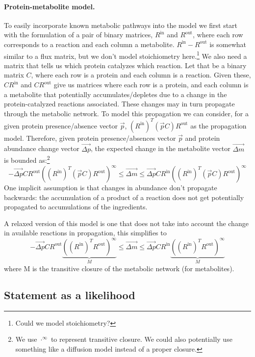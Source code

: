 \documentclass{article}
\begin{document}
\paragraph{Protein-metabolite model.}
To easily incorporate known metabolic pathways into the model we first start with the formulation of a pair of binary matrices, $R^\text{in}$ and $R^\text{out}$, where each row corresponds to a reaction and each column a metabolite.
$R^\text{in} - R^\text{out}$ is somewhat similar to a flux matrix, but we don't model stoichiometry here.\footnote{Could we model stoichiometry?}
We also need a matrix that tells us which protein catalyzes which reaction.
Let that be a binary matrix $C$, where each row is a protein and each column is a reaction.
Given these, $C R^\text{in}$ and $C R^\text{out}$ give us matrices where each row is a protein, and each column is a metabolite that potentially accumulates/depletes due to a change in the protein-catalyzed reactions associated.
These changes may in turn propagate through the metabolic network.
To model this propagation we can consider, for a given protein presence/absence vector $\vec p$, $(R^\text{in})^T ( \vec p C ) R^\text{out}$ as the propagation model.
Therefore, given protein presence/absences vector $\vec p$ and protein abundance change vector $\vec{\Delta p}$, the expected change in the metabolite vector $\vec{ \Delta m}$ is bounded as:\footnote{We use $\cdot^\infty$ to represent transitive closure. We could also potentially use something like a diffusion model instead of a proper closure.}
\[
 -\vec{\Delta p} C R^\text{out} ( (R^\text{in})^T ( \vec p C ) R^\text{out} )^\infty \leq \vec{ \Delta m} \leq \vec{\Delta p} C R^\text{in} ( (R^\text{in})^T ( \vec p C ) R^\text{out} )^\infty
\]
One implicit assumption is that changes in abundance don't propagate backwards: the accumulation of a product of a reaction does not get potentially propagated to accumulations of the ingredients.

A relaxed version of this model is one that does not take into account the change in available reactions in propagation, this simplifies to
\begin{equation} \label{eq:metabolite-bounds}
 -\vec{\Delta p} C R^\text{out} \underbrace{( (R^\text{in})^T R^\text{out} )^\infty}_M \leq \vec{ \Delta m} \leq \vec{\Delta p} C R^\text{in} \underbrace{( (R^\text{in})^T R^\text{out} )^\infty}_M
\end{equation}
where M is the transitive closure of the metabolic network (for metabolites).

\subsection{Statement as a likelihood}
\end{document}
